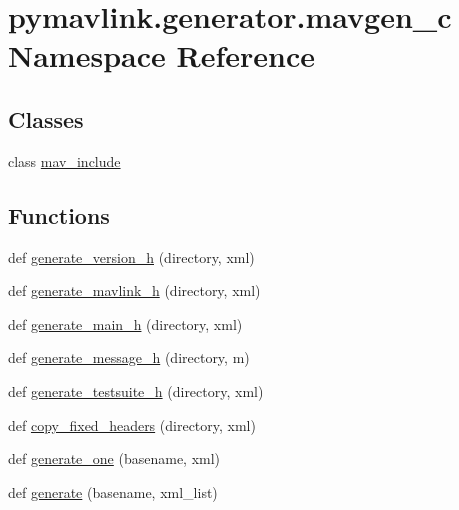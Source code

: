 \hypertarget{namespacepymavlink_1_1generator_1_1mavgen__c}{}\section{pymavlink.\+generator.\+mavgen\+\_\+c Namespace Reference}
\label{namespacepymavlink_1_1generator_1_1mavgen__c}
\subsection*{Classes}
\begin{DoxyCompactItemize}
\item 
class \mbox{\hyperlink{classpymavlink_1_1generator_1_1mavgen__c_1_1mav__include}{mav\+\_\+include}}
\end{DoxyCompactItemize}
\subsection*{Functions}
\begin{DoxyCompactItemize}
\item 
def \mbox{\hyperlink{namespacepymavlink_1_1generator_1_1mavgen__c_a205f217ad0dbb66616d4b22cd91e6d5e}{generate\+\_\+version\+\_\+h}} (directory, xml)
\item 
def \mbox{\hyperlink{namespacepymavlink_1_1generator_1_1mavgen__c_a6386de4b9abb860e912889c7ee80c29d}{generate\+\_\+mavlink\+\_\+h}} (directory, xml)
\item 
def \mbox{\hyperlink{namespacepymavlink_1_1generator_1_1mavgen__c_a09e8fc15eab60988aced8eb66f6f011f}{generate\+\_\+main\+\_\+h}} (directory, xml)
\item 
def \mbox{\hyperlink{namespacepymavlink_1_1generator_1_1mavgen__c_a123dcae06322bbc40fe755d31c7064ad}{generate\+\_\+message\+\_\+h}} (directory, m)
\item 
def \mbox{\hyperlink{namespacepymavlink_1_1generator_1_1mavgen__c_a0e011b90c365fd8dcb174271880c26e0}{generate\+\_\+testsuite\+\_\+h}} (directory, xml)
\item 
def \mbox{\hyperlink{namespacepymavlink_1_1generator_1_1mavgen__c_a3a09ff51409f0e3465b69f6760f622fb}{copy\+\_\+fixed\+\_\+headers}} (directory, xml)
\item 
def \mbox{\hyperlink{namespacepymavlink_1_1generator_1_1mavgen__c_aab7c75fa969b1d44059ca021ff91c91f}{generate\+\_\+one}} (basename, xml)
\item 
def \mbox{\hyperlink{namespacepymavlink_1_1generator_1_1mavgen__c_a40a6fdda7e5220bab2069a50a82afe48}{generate}} (basename, xml\+\_\+list)
\end{DoxyCompactItemize}
